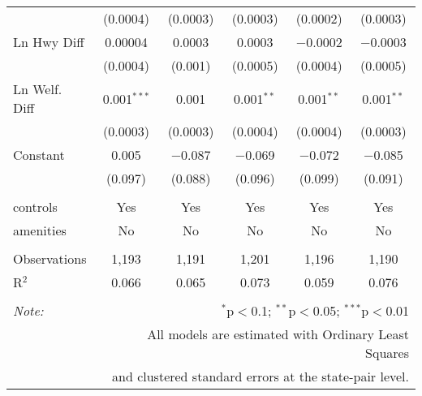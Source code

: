 \begin{table}[!htbp]
\begin{tabular}{@{\extracolsep{5pt}}lccccc}
  & (0.0004) & (0.0003) & (0.0003) & (0.0002) & (0.0003) \\ 
  Ln Hwy Diff & 0.00004 & 0.0003 & 0.0003 & $-$0.0002 & $-$0.0003 \\ 
  & (0.0004) & (0.001) & (0.0005) & (0.0004) & (0.0005) \\ 
  Ln Welf. Diff & 0.001$^{***}$ & 0.001 & 0.001$^{**}$ & 0.001$^{**}$ & 0.001$^{**}$ \\ 
  & (0.0003) & (0.0003) & (0.0004) & (0.0004) & (0.0003) \\ 
  Constant & 0.005 & $-$0.087 & $-$0.069 & $-$0.072 & $-$0.085 \\ 
  & (0.097) & (0.088) & (0.096) & (0.099) & (0.091) \\ 
 \hline \\[-1.8ex] 
controls & Yes & Yes & Yes & Yes & Yes \\ 
amenities & No & No & No & No & No \\ 
\hline \\[-1.8ex] 
Observations & 1,193 & 1,191 & 1,201 & 1,196 & 1,190 \\ 
R$^{2}$ & 0.066 & 0.065 & 0.073 & 0.059 & 0.076 \\ 
\hline 
\hline \\[-1.8ex] 
\textit{Note:}  & \multicolumn{5}{r}{$^{*}$p$<$0.1; $^{**}$p$<$0.05; $^{***}$p$<$0.01} \\ 
 & \multicolumn{5}{r}{All models are estimated with Ordinary Least Squares} \\ 
 & \multicolumn{5}{r}{and clustered standard errors at the state-pair level.} \\ 
\end{tabular} 
\end{table} 
